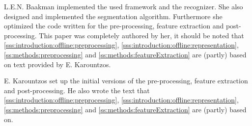 \begin{IEEEbiographynophoto}{L.E.N. Baakman}
implemented the used framework and the recognizer. She also designed and implemented the segmentation algorithm. Furthermore she optimized the code written for the pre-processing, feature extraction and post-processing. This paper was completely authored by her, it should be noted that \cref{sss:introduction:offline:preprocessing}, \ref{sss:introduction:offline:representation}, \ref{ss:methods:preprocessing} and \ref{ss:methods:featureExtraction} are (partly) based on text provided by E. Karountzos.
\end{IEEEbiographynophoto}

\begin{IEEEbiographynophoto}{E. Karountzos}
set up the initial versions of the pre-processing, feature extraction and post-processing. He also wrote the text that \cref{sss:introduction:offline:preprocessing}, \ref{sss:introduction:offline:representation}, \ref{ss:methods:preprocessing} and \ref{ss:methods:featureExtraction} are (partly) based on.
\end{IEEEbiographynophoto}
